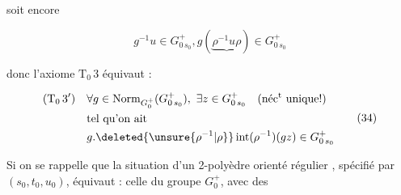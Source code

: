 soit encore

\[
g^{-1}u\in G^+_{0\,s_0},g(\underbrace{\rho^{-1}u\rho})\in G^+_{0\,s_0}
\]

donc l'axiome $\mathrm T_0\,3$ équivaut :


\[
\begin{aligned}
(\mathrm T_0\,3')\quad &\forall g\in\operatorname{Norm}_{G_0^+}(G^+_{0\,s_0}),\ \exists z\in G^+_{0\,s_0}\quad\text{(néc$^{\rm t}$ unique!)}\\
&\text{tel qu'on ait}\\
&g.\deleted{\unsure{\rho^{-1}|\rho}}\operatorname{int}(\rho^{-1})(gz)\in G^+_{0\,s_0}
\end{aligned}\tag*{(34)}
\]


Si on se rappelle que la situation d'un 2-polyèdre orienté  régulier , spécifié par $(s_0,t_0,u_0)$, équivaut : celle du groupe $G_0^+$, avec des
